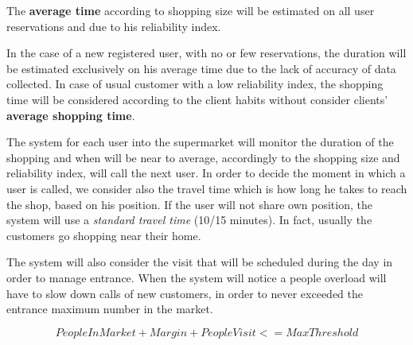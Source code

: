 The \textbf{average time} according to shopping size will be estimated on all user reservations and  due to his reliability index.

 

In the case of a new registered user, with no or few reservations, the duration will be estimated exclusively on his average time due to the lack of accuracy of data collected.
In case of usual customer with a low reliability index, the shopping time will be considered according to the client habits without consider clients' \textbf{average shopping time}.

 

The system for each user into the supermarket will monitor the duration of the shopping and when will be near to average, accordingly to the shopping size and reliability index, will call the next user. In order to decide the moment in which a user is called, we consider also the travel time which is how long he takes to reach the shop, based on his position.
If the user will not share own position, the system will use a \textit{standard travel time} (10/15 minutes). In fact, usually the customers go shopping near their home.

 

The system will also consider the visit that will be scheduled during the day in order to manage entrance.
When the system will notice a people overload will have to slow down calls of new customers, in order to never exceeded the entrance maximum number in the market. 
  
\[PeopleInMarket + Margin + PeopleVisit <= MaxThreshold\]

